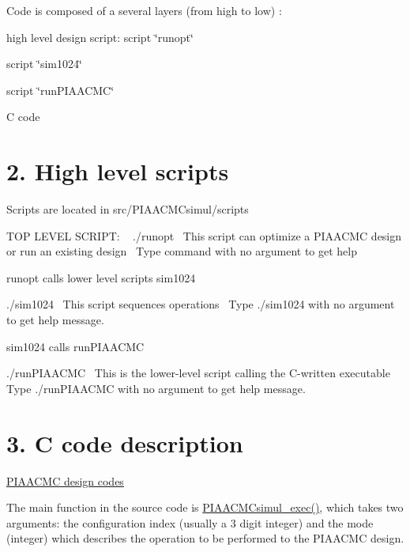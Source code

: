 Code is composed of a several layers (from high to low) \+:
\begin{DoxyItemize}
\item high level design script\+: script \char`\"{}runopt\char`\"{}
\item script \char`\"{}sim1024\char`\"{}
\item script \char`\"{}run\+P\+I\+A\+A\+C\+M\+C\char`\"{}
\item C code
\end{DoxyItemize}\hypertarget{md_src_PIAACMCsimul_README_scripts}{}\section{2. High level scripts}\label{md_src_PIAACMCsimul_README_scripts}
Scripts are located in src/\+P\+I\+A\+A\+C\+M\+Csimul/scripts

T\+O\+P L\+E\+V\+E\+L S\+C\+R\+I\+P\+T\+: ~\newline
./runopt~\newline
This script can optimize a P\+I\+A\+A\+C\+M\+C design or run an existing design~\newline
Type command with no argument to get help

runopt calls lower level scripts sim1024

./sim1024~\newline
This script sequences operations~\newline
Type ./sim1024 with no argument to get help message.

sim1024 calls run\+P\+I\+A\+A\+C\+M\+C

./run\+P\+I\+A\+A\+C\+M\+C~\newline
This is the lower-\/level script calling the C-\/written executable~\newline
Type ./run\+P\+I\+A\+A\+C\+M\+C with no argument to get help message.\hypertarget{md_src_PIAACMCsimul_README_code}{}\section{3. C code description}\label{md_src_PIAACMCsimul_README_code}
\hyperlink{PIAACMC_designcodes}{P\+I\+A\+A\+C\+M\+C design codes}

The main function in the source code is \hyperlink{PIAACMCdesign_2src_2PIAACMCsimul_2PIAACMCsimul_8c_a1083c078214e43d74447950f8a236c5d}{P\+I\+A\+A\+C\+M\+Csimul\+\_\+exec()}, which takes two arguments\+: the configuration index (usually a 3 digit integer) and the mode (integer) which describes the operation to be performed to the P\+I\+A\+A\+C\+M\+C design.

